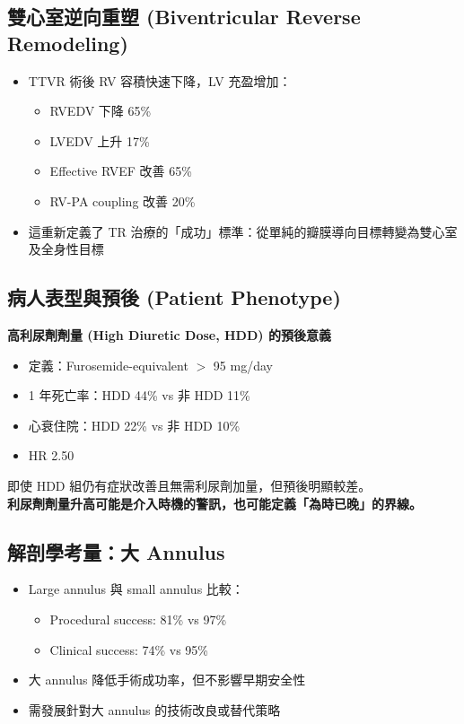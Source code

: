 \documentclass[12pt,a4paper]{article}
\begin{document}
\subsection{雙心室逆向重塑 (Biventricular Reverse Remodeling)}

\begin{itemize}[leftmargin=*]
    \item TTVR 術後 RV 容積快速下降，LV 充盈增加：
    \begin{itemize}[nosep]
        \item RVEDV 下降 65\%
        \item LVEDV 上升 17\%
        \item Effective RVEF 改善 65\%
        \item RV-PA coupling 改善 20\%
    \end{itemize}
    \item 這重新定義了 TR 治療的「成功」標準：從單純的瓣膜導向目標轉變為雙心室及全身性目標
\end{itemize}

\subsection{病人表型與預後 (Patient Phenotype)}

\begin{importantbox}
\textbf{高利尿劑劑量 (High Diuretic Dose, HDD) 的預後意義}

\begin{itemize}[nosep]
    \item 定義：Furosemide-equivalent $>$ 95 mg/day
    \item 1 年死亡率：HDD 44\% vs 非 HDD 11\%
    \item 心衰住院：HDD 22\% vs 非 HDD 10\%
    \item HR 2.50
\end{itemize}

即使 HDD 組仍有症狀改善且無需利尿劑加量，但預後明顯較差。\\
\textbf{利尿劑劑量升高可能是介入時機的警訊，也可能定義「為時已晚」的界線。}
\end{importantbox}

\subsection{解剖學考量：大 Annulus}

\begin{itemize}[leftmargin=*]
    \item Large annulus 與 small annulus 比較：
    \begin{itemize}[nosep]
        \item Procedural success: 81\% vs 97\%
        \item Clinical success: 74\% vs 95\%
    \end{itemize}
    \item 大 annulus 降低手術成功率，但不影響早期安全性
    \item 需發展針對大 annulus 的技術改良或替代策略
\end{itemize}
\end{document}
